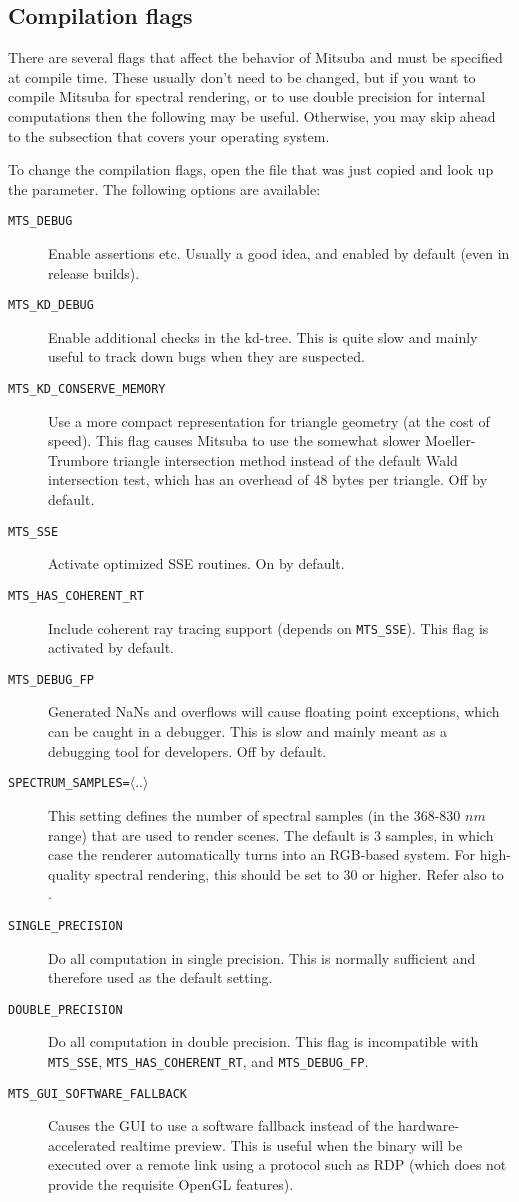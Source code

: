 \subsection{Compilation flags}
\label{sec:compiling-flags}
There are several flags that affect the behavior of Mitsuba and must be specified at compile time.
These usually don't need to be changed, but if you want to compile Mitsuba for spectral rendering, or
to use double precision for internal computations then the following may be useful. Otherwise, you may skip ahead to the subsection
that covers your operating system.

To change the compilation flags, open the  file that was just copied and look up the  parameter.
The following options are available:
\begin{description}
\item[\texttt{MTS\_DEBUG}] Enable assertions etc. Usually a good idea, and
enabled by default (even in release builds).
\item[\texttt{MTS\_KD\_DEBUG}] Enable additional checks in the kd-tree. This
is quite slow and mainly useful to track down bugs when they are suspected.
\item[\texttt{MTS\_KD\_CONSERVE\_MEMORY}] Use a more compact representation
for triangle geometry (at the cost of speed). This flag causes Mitsuba to use the somewhat slower
Moeller-Trumbore triangle intersection method instead of the default Wald
intersection test, which has an overhead of 48 bytes per triangle.
Off by default.
\item[\texttt{MTS\_SSE}]Activate optimized SSE routines. On by default.
\item[\texttt{MTS\_HAS\_COHERENT\_RT}]Include coherent ray tracing support (depends on \texttt{MTS\_SSE}). This flag is activated by default.
\item[\texttt{MTS\_DEBUG\_FP}]Generated NaNs and overflows will cause floating point exceptions, which can be caught in a debugger. This is slow and mainly meant as a debugging tool for developers. Off by default.
\item[\texttt{SPECTRUM\_SAMPLES=}$\langle ..\rangle$]This setting defines the number of spectral samples (in the 368-830 $nm$ range) that are used to render scenes. The default is 3 samples, in which case the renderer automatically turns into an RGB-based system. For high-quality spectral rendering, this should be set to 30 or higher.
Refer also to .
\item[\texttt{SINGLE\_PRECISION}] Do all computation in single precision. This is normally sufficient and therefore used as the default setting.
\item[\texttt{DOUBLE\_PRECISION}] Do all computation in double precision. This flag is incompatible with
\texttt{MTS\_SSE}, \texttt{MTS\_HAS\_COHERENT\_RT}, and \texttt{MTS\_DEBUG\_FP}.
\item[\texttt{MTS\_GUI\_SOFTWARE\_FALLBACK}]Causes the GUI to use a software
fallback instead of the hardware-accelerated realtime preview.
This is useful when the binary will be executed over a remote link using a
protocol such as RDP (which does not provide the requisite OpenGL features).
\end{description}
